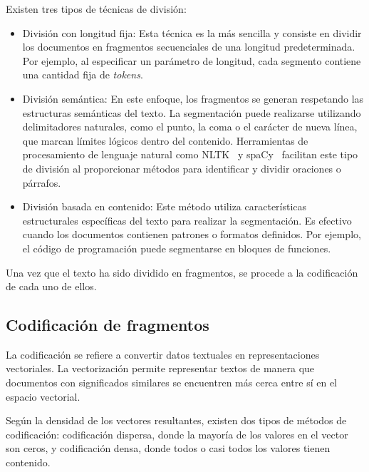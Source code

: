 Existen tres tipos de técnicas de división:
\begin{itemize}
    \item División con longitud fija: Esta técnica es la más sencilla y consiste en dividir los documentos en fragmentos secuenciales de una longitud predeterminada. Por ejemplo, al especificar un parámetro de longitud, cada segmento contiene una cantidad fija de \textit{tokens}.
    \item División semántica: En este enfoque, los fragmentos se generan respetando las estructuras semánticas del texto. La segmentación puede realizarse utilizando delimitadores naturales, como el punto, la coma o el carácter de nueva línea, que marcan límites lógicos dentro del contenido. Herramientas de procesamiento de lenguaje natural como NLTK~\cite{nltk2001} y spaCy~\cite{spacy2016} facilitan este tipo de división al proporcionar métodos para identificar y dividir oraciones o párrafos.
    \item División basada en contenido: Este método utiliza características estructurales específicas del texto para realizar la segmentación. Es efectivo cuando los documentos contienen patrones o formatos definidos. Por ejemplo, el código de programación puede segmentarse en bloques de funciones.
\end{itemize}

Una vez que el texto ha sido dividido en fragmentos, se procede a la codificación de cada uno de ellos.

\subsection{Codificación de fragmentos}

La codificación se refiere a convertir datos textuales en representaciones vectoriales. La vectorización permite representar textos de manera que documentos con significados similares se encuentren más cerca entre sí en el espacio vectorial. 

Según la densidad de los vectores resultantes, existen dos tipos de métodos de codificación: codificación dispersa, donde la mayoría de los valores en el vector son ceros, y codificación densa, donde todos o casi todos los valores tienen contenido.

